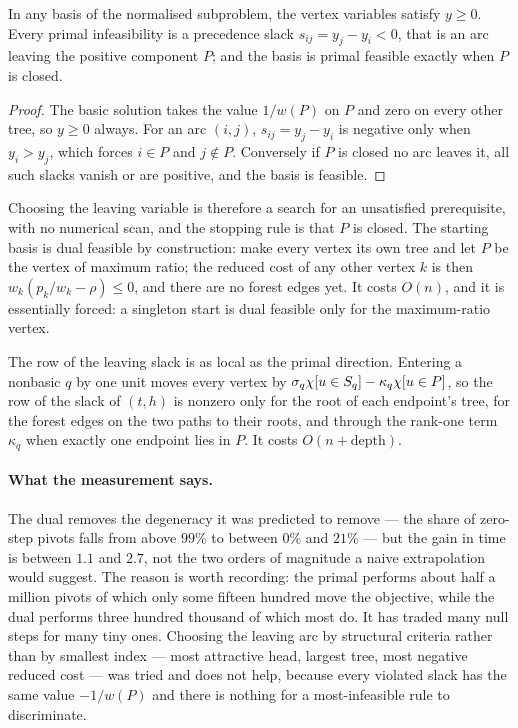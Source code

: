 \begin{proposition}\label{prop:dual-shape}
In any basis of the normalised subproblem, the vertex variables satisfy $y\ge 0$.
Every primal infeasibility is a precedence slack $s_{ij}=y_j-y_i<0$, that is an
arc leaving the positive component $P$; and the basis is primal feasible exactly
when $P$ is closed.
\end{proposition}
\begin{proof}
The basic solution takes the value $1/w(P)$ on $P$ and zero on every other tree,
so $y\ge0$ always. For an arc $(i,j)$, $s_{ij}=y_j-y_i$ is negative only when
$y_i>y_j$, which forces $i\in P$ and $j\notin P$. Conversely if $P$ is closed no
arc leaves it, all such slacks vanish or are positive, and the basis is feasible.
\end{proof}

Choosing the leaving variable is therefore a search for an unsatisfied
prerequisite, with no numerical scan, and the stopping rule is that $P$ is
closed. The starting basis is dual feasible by construction: make every vertex its
own tree and let $P$ be the vertex of maximum ratio; the reduced cost of any other
vertex $k$ is then $w_k(p_k/w_k-\rho)\le0$, and there are no forest edges yet. It
costs $O(n)$, and it is essentially forced: a singleton start is dual feasible
only for the maximum-ratio vertex.

The row of the leaving slack is as local as the primal direction. Entering a
nonbasic $q$ by one unit moves every vertex by
$\sigma_q\chi[u\in S_q]-\kappa_q\chi[u\in P]$, so the row of the slack of
$(t,h)$ is nonzero only for the root of each endpoint's tree, for the forest
edges on the two paths to their roots, and through the rank-one term $\kappa_q$
when exactly one endpoint lies in $P$. It costs $O(n+\mathrm{depth})$.

\paragraph{What the measurement says.} The dual removes the degeneracy it was
predicted to remove --- the share of zero-step pivots falls from above $99\%$ to
between $0\%$ and $21\%$ --- but the gain in time is between $1.1$ and $2.7$,
not the two orders of magnitude a naive extrapolation would suggest. The reason
is worth recording: the primal performs about half a million pivots of which only
some fifteen hundred move the objective, while the dual performs three hundred
thousand of which most do. It has traded many null steps for many tiny ones.
Choosing the leaving arc by structural criteria rather than by smallest index
--- most attractive head, largest tree, most negative reduced cost --- was tried
and does not help, because every violated slack has the same value $-1/w(P)$ and
there is nothing for a most-infeasible rule to discriminate.

